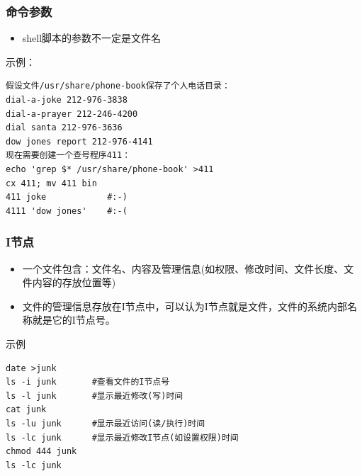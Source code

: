 \documentclass[xcolor=svgnames,presentation]{beamer}
\begin{document}
\begin{frame}[fragile]
\frametitle{命令参数}
\label{sec-1-1-3}
\begin{itemize}

\item shell脚本的参数不一定是文件名
\label{sec-1-1-3-1}%
\end{itemize} %
\begin{exampleblock}{示例：}
\label{sec-1-1-3-2}


\begin{verbatim}
假设文件/usr/share/phone-book保存了个人电话目录：
dial-a-joke 212-976-3838
dial-a-prayer 212-246-4200
dial santa 212-976-3636
dow jones report 212-976-4141
现在需要创建一个查号程序411：
echo 'grep $* /usr/share/phone-book' >411
cx 411; mv 411 bin
411 joke            #:-)
4111 'dow jones'    #:-(
\end{verbatim}
\end{exampleblock}
\end{frame}
\begin{frame}[fragile]
\frametitle{I节点}
\label{sec-1-1-4}
\begin{itemize}

\item 一个文件包含：文件名、内容及管理信息(如权限、修改时间、文件长度、文件内容的存放位置等)
\label{sec-1-1-4-1}%

\item 文件的管理信息存放在I节点中，可以认为I节点就是文件，文件的系统内部名称就是它的I节点号。
\label{sec-1-1-4-2}%
\end{itemize} %
\begin{exampleblock}{示例}
\label{sec-1-1-4-3}


\begin{verbatim}
date >junk
ls -i junk       #查看文件的I节点号
ls -l junk       #显示最近修改(写)时间
cat junk
ls -lu junk      #显示最近访问(读/执行)时间
ls -lc junk      #显示最近修改I节点(如设置权限)时间
chmod 444 junk
ls -lc junk
\end{verbatim}
\end{exampleblock}
\end{frame}
\end{document}
